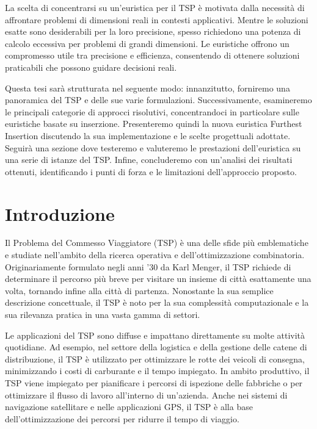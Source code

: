 \documentclass[a4paper,12pt]{report}
\begin{document}
La scelta di concentrarsi su un'euristica per il TSP è motivata dalla necessità di affrontare problemi di dimensioni reali in contesti applicativi. Mentre le soluzioni esatte sono desiderabili per la loro precisione, spesso richiedono una potenza di calcolo eccessiva per problemi di grandi dimensioni. Le euristiche offrono un compromesso utile tra precisione e efficienza, consentendo di ottenere soluzioni praticabili che possono guidare decisioni reali.

Questa tesi sarà strutturata nel seguente modo: innanzitutto, forniremo una panoramica del TSP e delle sue varie formulazioni. Successivamente, esamineremo le principali categorie di approcci risolutivi, concentrandoci in particolare sulle euristiche basate su inserzione. Presenteremo quindi la nuova euristica Furthest Insertion discutendo la sua implementazione e le scelte progettuali adottate. Seguirà una sezione dove testeremo e valuteremo le prestazioni dell'euristica su una serie di istanze del TSP. Infine, concluderemo con un'analisi dei risultati ottenuti, identificando i punti di forza e le limitazioni dell'approccio proposto.

\afterpreface
% 
% 
\chapter{Introduzione}
Il Problema del Commesso Viaggiatore (TSP) è una delle sfide più emblematiche e studiate nell'ambito della ricerca operativa e dell'ottimizzazione combinatoria. Originariamente formulato negli anni '30 da Karl Menger, il TSP richiede di determinare il percorso più breve per visitare un insieme di città esattamente una volta, tornando infine alla città di partenza. Nonostante la sua semplice descrizione concettuale, il TSP è noto per la sua complessità computazionale e la sua rilevanza pratica in una vasta gamma di settori.

Le applicazioni del TSP sono diffuse e impattano direttamente su molte attività quotidiane. Ad esempio, nel settore della logistica e della gestione delle catene di distribuzione, il TSP è utilizzato per ottimizzare le rotte dei veicoli di consegna, minimizzando i costi di carburante e il tempo impiegato. In ambito produttivo, il TSP viene impiegato per pianificare i percorsi di ispezione delle fabbriche o per ottimizzare il flusso di lavoro all'interno di un'azienda. Anche nei sistemi di navigazione satellitare e nelle applicazioni GPS, il TSP è alla base dell'ottimizzazione dei percorsi per ridurre il tempo di viaggio.
\end{document}
